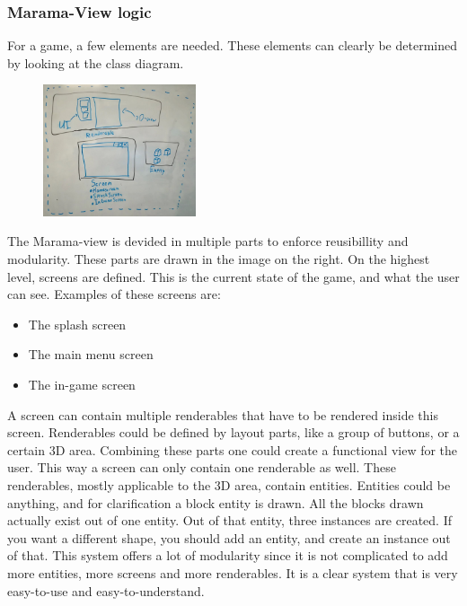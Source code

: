\documentclass[10pt]{extarticle} %
\begin{document}
    \subsubsection[MaramaViewLogic]{Marama-View logic}
    For a game, a few elements are needed. These elements can clearly be determined by looking at the class diagram. \\
    \begin{figure}
        \includegraphics[width=0.4\textwidth]{marama-view-structure.jpg}
    \end{figure}
    The Marama-view is devided in multiple parts to enforce reusibillity and modularity.
    These parts are drawn in the image on the right.
    On the highest level, screens are defined.
    This is the current state of the game, and what the user can see.
    Examples of these screens are:
    \begin{itemize}
        \item The splash screen
        \item The main menu screen
        \item The in-game screen
    \end{itemize}
    A screen can contain multiple renderables that have to be rendered inside this screen.
    Renderables could be defined by layout parts, like a group of buttons, or a certain 3D area.
    Combining these parts one could create a functional view for the user.
    This way a screen can only contain one renderable as well.
    These renderables, mostly applicable to the 3D area, contain entities.
    Entities could be anything, and for clarification a block entity is drawn.
    All the blocks drawn actually exist out of one entity.
    Out of that entity, three instances are created.
    If you want a different shape, you should add an entity, and create an instance out of that.
    This system offers a lot of modularity since it is not complicated to add more entities, more screens and more renderables.
    It is a clear system that is very easy-to-use and easy-to-understand.
    \newpage
\end{document}
